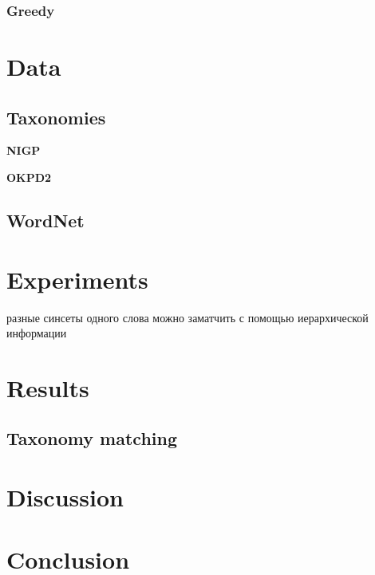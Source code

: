 \documentclass[11pt,a4paper]{article}
\begin{document}
\subsubsection{Greedy}
\section{Data}
\subsection{Taxonomies}
\textbf{NIGP}

\textbf{OKPD2}
\subsection{WordNet}
\section{Experiments}
\foreignlanguage{russian}{разные синсеты одного слова можно заматчить с помощью иерархической информации}
\section{Results}
\subsection{Taxonomy matching}
\section{Discussion}
\section{Conclusion}
\end{document}
